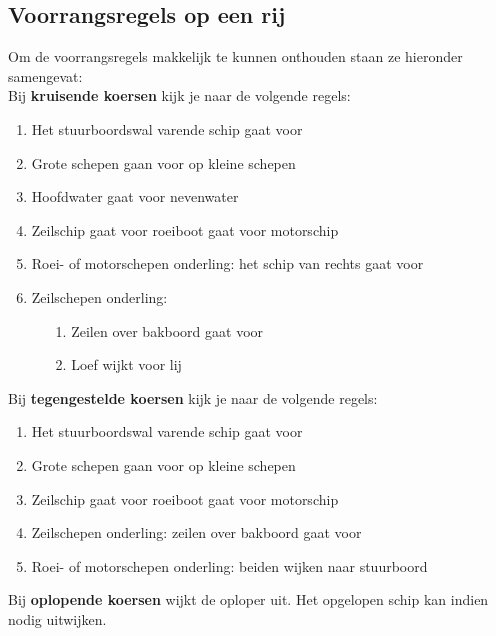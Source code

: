 \newpage
\subsection{Voorrangsregels op een rij}
Om de voorrangsregels makkelijk te kunnen onthouden staan ze hieronder samengevat:\\[0.1cm]
Bij \textbf{kruisende koersen} kijk je naar de volgende regels:
\vspace*{-0.15cm}
\begin{enumerate}
	\item Het stuurboordswal varende schip gaat voor
	\item Grote schepen gaan voor op kleine schepen
	\item Hoofdwater gaat voor nevenwater
	\item Zeilschip gaat voor roeiboot gaat voor motorschip
	\item Roei- of motorschepen onderling: het schip van rechts gaat voor
	\item Zeilschepen onderling: 
	\begin{enumerate}
		\item [1.]Zeilen over bakboord gaat voor
		\item [2.]Loef wijkt voor lij
	\end{enumerate}
\end{enumerate}

Bij \textbf{tegengestelde koersen} kijk je naar de volgende regels:
\vspace*{-0.15cm}
\begin{enumerate}
	\item Het stuurboordswal varende schip gaat voor
	\item Grote schepen gaan voor op kleine schepen
	\item Zeilschip gaat voor roeiboot gaat voor motorschip
	\item Zeilschepen onderling: zeilen over bakboord gaat voor
	\item Roei- of motorschepen onderling: beiden wijken naar stuurboord
\end{enumerate}

Bij \textbf{oplopende koersen} wijkt de oploper uit. Het opgelopen schip kan indien nodig uitwijken.

